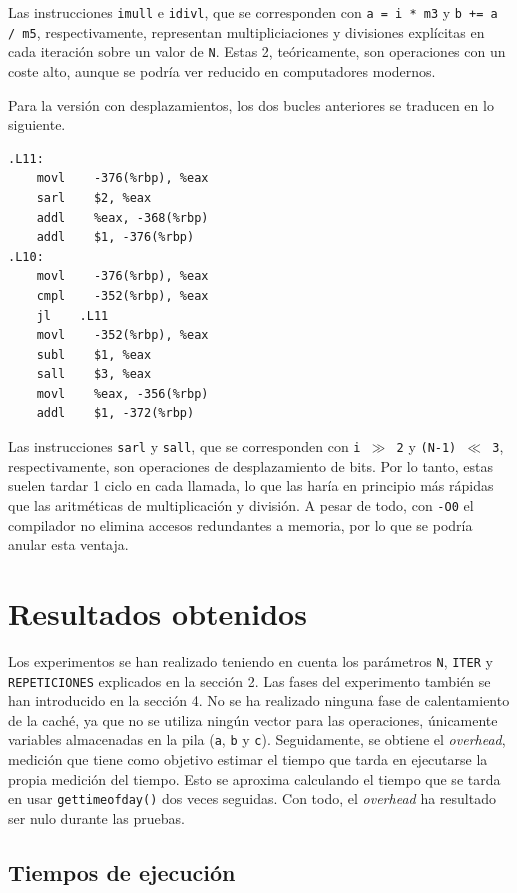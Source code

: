 \documentclass[11pt,a4paper,twoside]{article}
\theoremstyle{definition}
\begin{document}
	Las instrucciones \texttt{imull} e \texttt{idivl}, que se corresponden con \texttt{a = i * m3} y \texttt{b += a / m5}, respectivamente, representan multipliciaciones y divisiones explícitas en cada iteración sobre un valor de \texttt{N}. Estas 2, teóricamente, son operaciones con un coste alto, aunque se podría ver reducido en computadores modernos.
	
	Para la versión con desplazamientos, los dos bucles anteriores se traducen en lo siguiente.
	
	\begin{verbatim}
.L11:
	movl	-376(%rbp), %eax
	sarl	$2, %eax
	addl	%eax, -368(%rbp)
	addl	$1, -376(%rbp)
.L10:
	movl	-376(%rbp), %eax
	cmpl	-352(%rbp), %eax
	jl	  .L11
	movl	-352(%rbp), %eax
	subl	$1, %eax
	sall	$3, %eax
	movl	%eax, -356(%rbp)
	addl	$1, -372(%rbp)
	\end{verbatim}

	Las instrucciones \texttt{sarl} y \texttt{sall}, que se corresponden con \texttt{i $\gg$ 2} y \texttt{(N-1) $\ll$ 3}, respectivamente, son operaciones de desplazamiento de bits. Por lo tanto, estas suelen tardar 1 ciclo en cada llamada, lo que las haría en principio más rápidas que las aritméticas de multiplicación y división. A pesar de todo, con \texttt{-O0} el compilador no elimina accesos redundantes a memoria, por lo que se podría anular esta ventaja.
	
	
	\section{Resultados obtenidos}
	
	Los experimentos se han realizado teniendo en cuenta los parámetros \texttt{N}, \texttt{ITER} y \texttt{REPETICIONES} explicados en la sección 2. Las fases del experimento también se han introducido en la sección 4. No se ha realizado ninguna fase de calentamiento de la caché, ya que no se utiliza ningún vector para las operaciones, únicamente variables almacenadas en la pila (\texttt{a}, \texttt{b} y \texttt{c}). Seguidamente, se obtiene el \textit{overhead}, medición que tiene como objetivo estimar el tiempo que tarda en ejecutarse la propia medición del tiempo. Esto se aproxima calculando el tiempo que se tarda en usar \texttt{gettimeofday()} dos veces seguidas. Con todo, el \textit{overhead} ha resultado ser nulo durante las pruebas.
	
	\subsection{Tiempos de ejecución}
	
\end{document}
